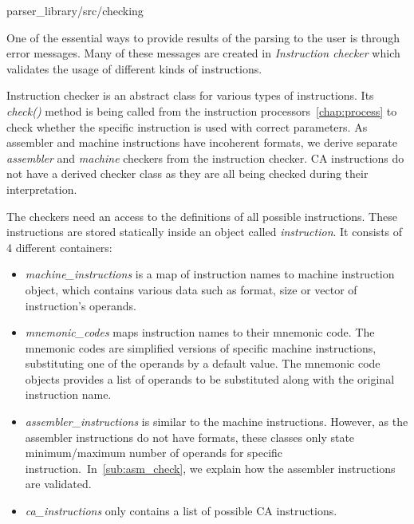 {parser\_library/src/checking}

\label{checker}
One of the essential ways to provide results of the parsing to the user is through error messages. Many of these messages are created in \emph{Instruction checker} which validates the usage of different kinds of instructions.

Instruction checker is an abstract class for various types of instructions. Its \emph{check()} method is being called from the instruction processors~\ref{chap:process} to check whether the specific instruction is used with correct parameters. As assembler and machine instructions have incoherent formats, we derive separate \emph{assembler} and \emph{machine} checkers from the instruction checker. CA instructions do not have a derived checker class as they are all being checked during their interpretation.

The checkers need an access to the definitions of all possible instructions. These instructions are stored statically inside an object called \emph{instruction}. It consists of 4 different containers:
\begin{itemize}
	\item \emph{machine\_instructions} is a map of instruction names to machine instruction object, which contains various data such as format, size or vector of instruction's operands.
	\item \emph{mnemonic\_codes} maps instruction names to their mnemonic code. The mnemonic codes are simplified versions of specific machine instructions, substituting one of the operands by a default value. The mnemonic code objects provides a list of operands to be substituted along with the original instruction name.
	\item \emph{assembler\_instructions} is similar to the machine instructions. However, as the assembler instructions do not have formats, these classes only state minimum/maximum number of operands for specific instruction.~In~\cref{sub:asm_check}, we explain how the assembler instructions are validated.
	\item \emph{ca\_instructions} only contains a list of possible CA instructions.
\end{itemize}

